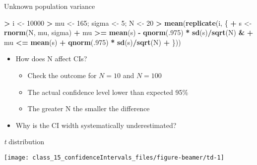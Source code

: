 \documentclass[
  ignorenonframetext,
]{beamer}
\newenvironment{Shaded}{\begin{snugshade}}{\end{snugshade}}
\newcommand{\DecValTok}[1]{\textcolor[rgb]{0.00,0.00,0.81}{#1}}
\newcommand{\FunctionTok}[1]{\textcolor[rgb]{0.13,0.29,0.53}{\textbf{#1}}}
\newcommand{\NormalTok}[1]{#1}
\newcommand{\OtherTok}[1]{\textcolor[rgb]{0.56,0.35,0.01}{#1}}
\newcommand{\SpecialCharTok}[1]{\textcolor[rgb]{0.81,0.36,0.00}{\textbf{#1}}}
\providecommand{\tightlist}{%
  \setlength{\itemsep}{0pt}\setlength{\parskip}{0pt}}
\begin{document}
\begin{frame}[fragile]{Unknown population variance}
\label{unknown-population-variance-1}
\begin{Shaded}
\begin{Highlighting}[]
\SpecialCharTok{\textgreater{}}\NormalTok{ i }\OtherTok{\textless{}{-}} \DecValTok{10000}
\SpecialCharTok{\textgreater{}}\NormalTok{ mu }\OtherTok{\textless{}{-}} \DecValTok{165}\NormalTok{; sigma }\OtherTok{\textless{}{-}} \DecValTok{5}\NormalTok{; N }\OtherTok{\textless{}{-}} \DecValTok{20}
\SpecialCharTok{\textgreater{}} \FunctionTok{mean}\NormalTok{(}\FunctionTok{replicate}\NormalTok{(i, \{}
\SpecialCharTok{+}\NormalTok{    s }\OtherTok{\textless{}{-}} \FunctionTok{rnorm}\NormalTok{(N, mu, sigma)}
\SpecialCharTok{+}\NormalTok{    mu }\SpecialCharTok{\textgreater{}=} \FunctionTok{mean}\NormalTok{(s) }\SpecialCharTok{{-}} \FunctionTok{qnorm}\NormalTok{(.}\DecValTok{975}\NormalTok{) }\SpecialCharTok{*} \FunctionTok{sd}\NormalTok{(s)}\SpecialCharTok{/}\FunctionTok{sqrt}\NormalTok{(N) }\SpecialCharTok{\&}
\SpecialCharTok{+}\NormalTok{    mu }\SpecialCharTok{\textless{}=} \FunctionTok{mean}\NormalTok{(s) }\SpecialCharTok{+} \FunctionTok{qnorm}\NormalTok{(.}\DecValTok{975}\NormalTok{) }\SpecialCharTok{*} \FunctionTok{sd}\NormalTok{(s)}\SpecialCharTok{/}\FunctionTok{sqrt}\NormalTok{(N)}
\SpecialCharTok{+}\NormalTok{ \}))}
\end{Highlighting}
\end{Shaded}

\begin{itemize}
\tightlist
\item
  How does N affect CIs?

  \begin{itemize}
  \tightlist
  \item
    Check the outcome for \(N=10\) and \(N=100\)
  \item
    The actual confidence level lower than expected 95\%
  \item
    The greater N the smaller the difference
  \end{itemize}
\item
  Why is the CI width systematically underestimated?
\end{itemize}
\end{frame}

\begin{frame}{\emph{t} distribution}
\label{t-distribution-1}
\begin{center}\texttt{[image: class\_15\_confidenceIntervals\_files/figure-beamer/td-1]} \end{center}
\end{frame}
\end{document}
